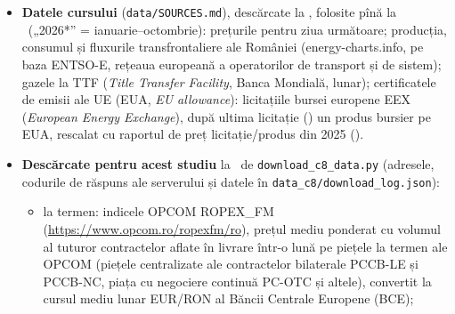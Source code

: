 \section{}
{\small
\begin{itemize}
\item {}%
{\textbf{Datele cursului} (\texttt{data/SOURCES.md}), descărcate la \NcourseDl, folosite pînă la \NdataEnd\ („2026*” = ianuarie--octombrie): prețurile pentru ziua următoare; producția, consumul și fluxurile transfrontaliere ale României (energy-charts.info, pe baza ENTSO-E, rețeaua europeană a operatorilor de transport și de sistem); gazele la TTF (\emph{Title Transfer Facility}, Banca Mondială, lunar); certificatele de emisii ale UE (EUA, \emph{EU allowance}): licitațiile bursei europene EEX (\emph{European Energy Exchange}), după ultima licitație (\NlastAuction) un produs bursier pe EUA, rescalat cu raportul de preț licitație/produs din 2025 (\NetcRatio).}
\item {}%
{\textbf{Descărcate pentru acest studiu} la \NcDl\ de \texttt{download\_c8\_data.py} (adresele, codurile de răspuns ale serverului și datele în \texttt{data\_c8/download\_log.json}):}
  \begin{itemize}
  \item {}%
  {la termen: indicele OPCOM ROPEX\_FM (\url{https://www.opcom.ro/ropexfm/ro}), prețul mediu ponderat cu volumul al tuturor contractelor aflate în livrare într-o lună pe piețele la termen ale OPCOM (piețele centralizate ale contractelor bilaterale PCCB-LE și PCCB-NC, piața cu negociere continuă PC-OTC și altele), convertit la cursul mediu lunar EUR/RON al Băncii Centrale Europene (BCE);}

\end{itemize}
\end{itemize}}
